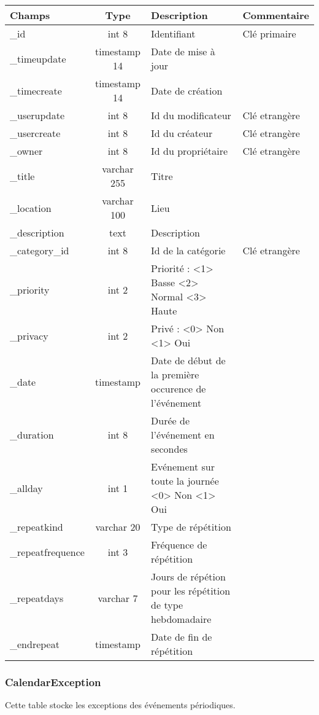 \begin{tabular}{|p{3cm}|c|p{5.4cm}|p{2.6cm}|}
\hline
\textbf{Champs} & \textbf{Type} & \textbf{Description} & \textbf{Commentaire} \\
\hline
\_id & int 8 & Identifiant &  Clé primaire \\
\hline
\_timeupdate & timestamp 14 & Date de mise à jour & \\
\hline
\_timecreate & timestamp 14 & Date de création & \\
\hline
\_userupdate & int 8 & Id du modificateur &  Clé etrangère\\
\hline
\_usercreate & int 8 & Id du créateur & Clé etrangère\\
\hline
\_owner & int 8 & Id du propriétaire & Clé etrangère\\
\hline
\_title & varchar 255 & Titre & \\
\hline
\_location & varchar 100 & Lieu & \\
\hline
\_description & text & Description & \\
\hline
\_category\_id & int 8 & Id de la catégorie & Clé etrangère\\
\hline
\_priority & int 2 & Priorité : <1> Basse <2> Normal <3> Haute & \\
\hline 
\_privacy & int 2 & Privé : <0> Non <1> Oui & \\
\hline
\_date & timestamp & Date de début de la première occurence de l'événement & \\
\hline
\_duration & int 8 & Durée de l'événement en secondes & \\
\hline
\_allday & int 1 & Evénement sur toute la journée <0> Non <1> Oui & \\
\hline
\_repeatkind & varchar 20 & Type de répétition & \\
\hline
\_repeatfrequence & int 3 & Fréquence de répétition & \\
\hline
\_repeatdays & varchar 7 & Jours de répétion pour les répétition de type
hebdomadaire & \\
\hline
\_endrepeat & timestamp & Date de fin de répétition & \\
\hline
\end{tabular}


\subsubsection{CalendarException}

Cette table stocke les exceptions des événements périodiques.\\

